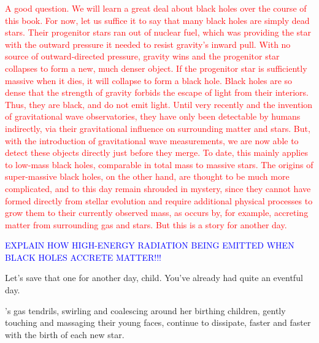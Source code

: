 \documentclass[main.tex]{subfiles}
\begin{document}
\begin{tcolorbox}[sharp corners, colback=red!30, colframe=red!80!blue, title=Black Holes]
\par \textcolor{red} {A good question.  We will learn a great deal about black holes over the course of this book.  For now, let us suffice it to say that many black holes are simply dead stars. Their progenitor stars ran out of nuclear fuel, which was providing the star with the outward pressure it needed to resist gravity's inward pull.  With no source of outward-directed pressure, gravity wins and the progenitor star collapses to form a new, much denser object.  If the progenitor star is sufficiently massive when it dies, it will collapse to form a black hole.  %
Black holes are so dense that the strength of gravity forbids the escape of light from their interiors.  Thus, they are black, and do not emit light.  Until very recently and the invention of gravitational wave observatories, they have only been detectable by humans indirectly, via their gravitational influence on surrounding matter and stars.  But, with the introduction of gravitational wave measurements, we are now able to detect these objects directly just before they merge.  To date, this mainly applies to low-mass black holes, comparable in total mass to massive stars.  The origins of super-massive black holes, on the other hand, are thought to be much more complicated, and to this day remain shrouded in mystery, since they cannot have formed directly from stellar evolution and require additional physical processes to grow them to their currently observed mass, as occurs by, for example, accreting matter from surrounding gas and stars.  But this is a story for another day.}
\end{tcolorbox}

\begin{tcolorbox}[sharp corners, colback=blue!30, colframe=blue!80!blue, title=Light From Accreting Black Holes]
\par \textcolor{blue} {EXPLAIN HOW HIGH-ENERGY RADIATION BEING EMITTED WHEN BLACK HOLES ACCRETE MATTER!!!}
\end{tcolorbox}


\par \Pleione Let's save that one for another day, child.  You've already had quite an eventful day.

\par \nar \rmpleione's gas tendrils, swirling and coalescing around her birthing children, gently touching and massaging their young faces, continue to dissipate, faster and faster with the birth of each new star.
\end{document}
